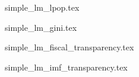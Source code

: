 \documentclass[a4paper, 10pt]{article}
\newcommand{\insertmodel}[2]{
  

}
\begin{document}


\insertmodel{simple_lm.tex}

\insertmodel{simple_lm_lpop.tex}

\insertmodel{simple_lm_incomeineq.tex}

\insertmodel{simple_lm_gini.tex}

\insertmodel{simple_lm_gdp_per_capita.tex}

\insertmodel{simple_lm_fiscal_transparency.tex}

\insertmodel{simple_lm_lassen_transparency.tex}

\insertmodel{simple_lm_imf_transparency.tex}
\end{document}
